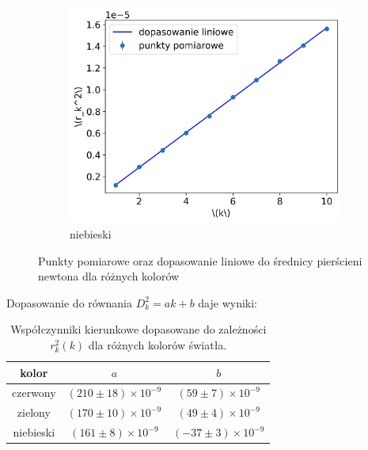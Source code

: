 \documentclass[12pt]{article}
\begin{document}
\begin{figure}[H]
\begin{subfigure}{0.3\textwidth}
		\includegraphics[width=\linewidth]{blue}
		\caption{niebieski}
		\label{fig:blue_line}
	\end{subfigure}
	\caption{Punkty pomiarowe oraz dopasowanie liniowe do średnicy pierścieni newtona dla różnych kolorów}
	\label{fig:line_graphs}
\end{figure}
Dopasowanie do równania \(D_k^2 = a k + b\) daje wyniki:
\begin{table}[H]
	\centering
	\begin{tabular}{c|cc}
		\toprule
		kolor     & $a$                             & $b$                            \\
		\midrule
		czerwony  & \((210 \pm 18) \times 10^{-9}\) & \((59 \pm 7) \times 10^{-9}\)  \\
		zielony   & \((170 \pm 10) \times 10^{-9}\) & \((49 \pm 4) \times 10^{-9}\)  \\
		niebieski & \((161 \pm 8) \times 10^{-9}\)  & \((-37 \pm 3) \times 10^{-9}\) \\
		\bottomrule
	\end{tabular}
	\caption{Współczynniki kierunkowe dopasowane do zależności \(r_k^2(k)\) dla różnych kolorów światła.}
	\label{tab:lines_params}
\end{table}
\end{document}
